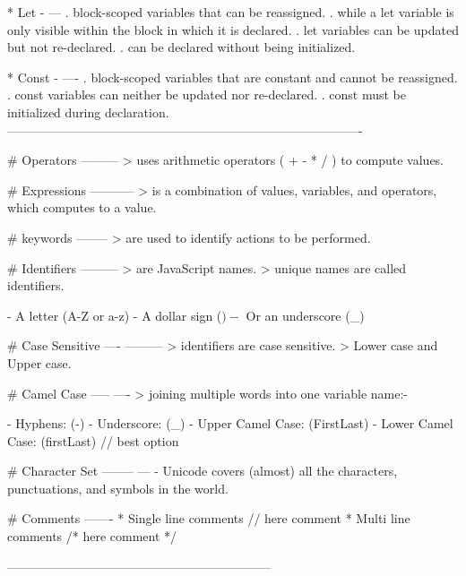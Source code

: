 
  * Let
  - ---
    . block-scoped variables that can be reassigned.
    . while a let variable is only visible within the block in which it is declared.
    . let variables can be updated but not re-declared.
    . can be declared without being initialized.

  * Const
  - ----
    . block-scoped variables that are constant and cannot be reassigned.
    . const variables can neither be updated nor re-declared.
    . const must be initialized during declaration.
-------------------------------------------------------------------------------------

# Operators
   ---------
   > uses arithmetic operators ( + - * / ) to compute values.

# Expressions
   -----------
   > is a combination of values, variables, and operators, which computes to a value.

# keywords 
   --------
  > are used to identify actions to be performed.

# Identifiers 
   ---------
  > are JavaScript names.
  > unique names are called identifiers.
  
   - A letter (A-Z or a-z)
   - A dollar sign ($)
   - $ Or an underscore (_)
   
# Case Sensitive
  ---- ---------
  > identifiers are case sensitive.
  > Lower case and Upper case.

# Camel Case
  ----- ----
  > joining multiple words into one variable name:-

  - Hyphens: (-)
  - Underscore: (_)
  - Upper Camel Case: (FirstLast)
  - Lower Camel Case: (firstLast) // best option

# Character Set
  --------  ---
  - Unicode covers (almost) all the characters, punctuations, and symbols in the world.

# Comments
   -------
    * Single line comments   // here comment
    * Multi line comments   /* here comment */

---------------------------------------------------------------








